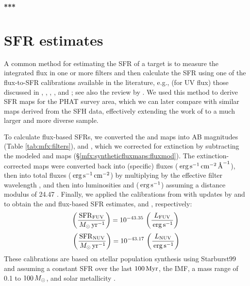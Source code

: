 \textbf{***}





\section{SFR estimates}\label{mfx:sfrestimates}

A common method for estimating the SFR of a target is to measure the integrated
flux in one or more filters and then calculate the SFR using one of the
flux-to-SFR calibrations available in the literature, e.g., (for UV flux) those
discussed in \citet{Kennicutt:1998}, \citet{Salim:2007}, \citet{Hao:2011},
\citet{Murphy:2011}, and \citet{Leroy:2012}; see also the review by
\citet{Kennicutt:2012}. We used this method to derive SFR maps for the PHAT
survey area, which we can later compare with similar maps derived from the
\citet{Lewis:2014} SFH data, effectively extending the work of
\citet{Simones:2014} to a much larger and more diverse sample.

To calculate flux-based SFRs, we converted the \ffuvobs{} and \fnuvobs{} maps
into AB magnitudes (Table \ref{tab:mfx:filters}), \fuvobs{} and \nuvobs{},
which we corrected for extinction by subtracting the modeled \afuv{} and
\anuv{} maps (\S \ref{mfx:syntheticfluxmaps:fluxmod}). The extinction-corrected
maps were converted back into (specific) fluxes ($\,\mathrm{erg} \,\mathrm{s}^{-1} \,\mathrm{cm}^{-2}
\,\textrm{\AA}^{-1}$), then into total fluxes ($\,\mathrm{erg} \,\mathrm{s}^{-1} \,\mathrm{cm}^{-2}$) by multiplying
by the effective filter wavelength \citep[$1538.6\ang$ for \fuv{}, $2315.7\ang$
for \nuv{};][]{Morrissey:2007}, and then into luminosities \lfuv{} and \lnuv{}
($\,\mathrm{erg} \,\mathrm{s}^{-1}$) assuming a distance modulus of 24.47
\citep{McConnachie:2005}. Finally, we applied the calibrations from
\citet{Kennicutt:1998} with updates by \citet{Hao:2011} and \citet{Murphy:2011}
\citep[see the review by][]{Kennicutt:2012} to obtain the \fuv{} and \nuv{}
flux-based SFR estimates, \sfrfuv{} and \sfrnuv{}, respectively:
\begin{equation}
\left(\frac{\mathrm{SFR}_{\mathrm{FUV}}}{\,M_\odot\,\mathrm{yr}^{-1}}\right) = 10^{-43.35}\,\left(\frac{L_{\mathrm{FUV}}}{\,\mathrm{erg}\,\mathrm{s}^{-1}}\right) \\
\end{equation}
\begin{equation}
\left(\frac{\mathrm{SFR}_{\mathrm{NUV}}}{\,M_\odot\,\mathrm{yr}^{-1}}\right) = 10^{-43.17}\,\left(\frac{L_{\mathrm{NUV}}}{\,\mathrm{erg}\,\mathrm{s}^{-1}}\right)
\end{equation}
These calibrations are based on stellar population synthesis using Starburst99
\citep{Leitherer:1999} and assuming a constant SFR over the last $100\,\mathrm{Myr}$, the
\citet{Kroupa:2001} IMF, a mass range of 0.1 to $100\,M_\odot$, and solar
metallicity \citep{Hao:2011}.


